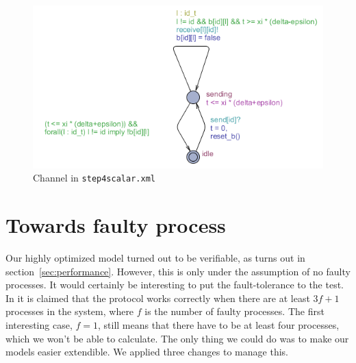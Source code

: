 \documentclass[a4paper,10pt]{article}
\begin{document}
\begin{enumerate}
\begin{figure}[!h]
\includegraphics{step4scalar_channel}
\caption{Channel in \texttt{step4scalar.xml}\label{fig:step4scalar_channel}}
\end{figure}

\end{enumerate}


\section{Towards faulty process\label{sec:faulty}}

Our highly optimized model turned out to be verifiable, as turns out in section~\ref{sec:performance}. However, this is only under the assumption of no faulty processes. It would certainly be interesting to put the fault-tolerance to the test. In \cite{Welch1984Anew} it is claimed that the protocol works correctly when there are at least \(3f+1\) processes in the system, where \(f\) is the number of faulty processes. The first interesting case, \(f=1\), still means that there have to be at least four processes, which we won't be able to calculate. The only thing we could do was to make our models easier extendible. We applied three changes to manage this.
\end{document}
